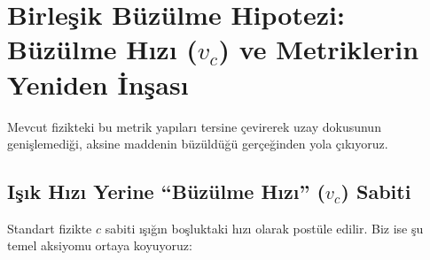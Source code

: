 \section{Birleşik Büzülme Hipotezi: Büzülme Hızı (\texorpdfstring{$v_c$}{vc}) ve Metriklerin Yeniden İnşası}
\label{sec:buzulme_metrikleri}

Mevcut fizikteki bu metrik yapıları tersine çevirerek uzay dokusunun genişlemediği, aksine maddenin büzüldüğü gerçeğinden yola çıkıyoruz.

\subsection{Işık Hızı Yerine ``Büzülme Hızı'' (\texorpdfstring{$v_c$}{vc}) Sabiti}
Standart fizikte $c$ sabiti ışığın boşluktaki hızı olarak postüle edilir. Biz ise şu temel aksiyomu ortaya koyuyoruz:


